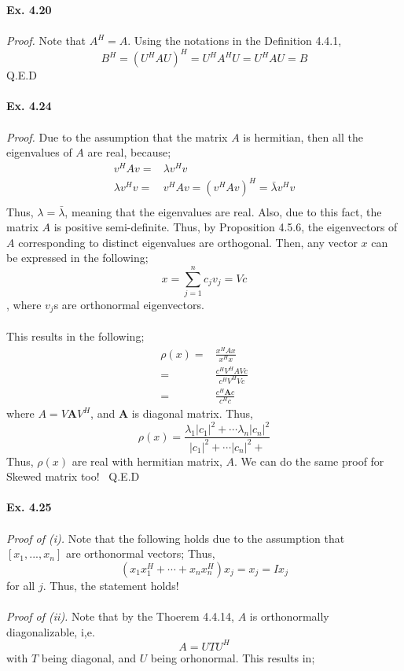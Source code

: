 \documentclass[letterpaper,12pt]{article}
\theoremstyle{definition}
\begin{document}
\begin{spacing}{1.3}{}
\textbf{Ex. 4.20} \\\\
\emph{Proof. } Note that $A^H = A$. Using the notations in the Definition 4.4.1,
\[B^H = (U^H A U)^H = U^H A^H U = U^H A U = B \]
Q.E.D \\\\
\textbf{Ex. 4.24}\\\\
\emph{Proof.} Due to the assumption that the matrix $A$ is hermitian, then all the eigenvalues of $A$ are real, because;
\begin{align*}
  v^H A v =& \lambda v^H v \\
  \lambda v^H v =& v^H Av = (v^H A v)^H  = \bar{\lambda} v^H v\\
\end{align*}
Thus, $\lambda = \bar{\lambda}$, meaning that the eigenvalues are real. Also, due to this fact, the matrix $A$ is positive semi-definite.  Thus, by Proposition 4.5.6, the eigenvectors of $A$ corresponding to distinct eigenvalues are orthogonal. Then, any vector $x$ can be expressed in the following;
\[x = \sum_{j=1}^{n} c_j v_j = Vc \], where $v_j$s are orthonormal eigenvectors.  \\\\
This results in the following;
\begin{align*}
  \rho(x) =& \frac{x^H A x}{x^H x}  \\
   =& \frac{c^H V^H A V c}{c^H V^H V c}  \\
   =& \frac{c^H \textbf{A} c}{c^H c}
\end{align*}
where $A = V \textbf{A} V^H$, and $\textbf{A}$ is diagonal matrix. Thus,
\[\rho(x) = \frac{\lambda_1 |c_1|^2 + \cdots \lambda_n |c_n|^2 }{|c_1|^2 + \cdots |c_n|^2 +} \]
Thus, $\rho(x)$ are real with hermitian matrix, $A$.
We can do the same proof for Skewed matrix too! \ Q.E.D \\\\
\textbf{Ex. 4.25}\\\\
\emph{Proof of (i).} Note that the following holds due to the assumption that $[x_1, ..., x_n]$ are orthonormal vectors; Thus,
\[(x_1 x_{1}^H + \cdots + x_n x_{n}^H) x_j = x_j = I x_j  \]
for all $j$. Thus, the statement holds! \\\\
\emph{Proof of (ii). } Note that by the Thoerem 4.4.14, $A$ is orthonormally diagonalizable, i,e.
\[ A = U T U^H\]
with $T$ being diagonal, and $U$ being orhonormal. This results in;\\

\end{spacing}
\end{document}

